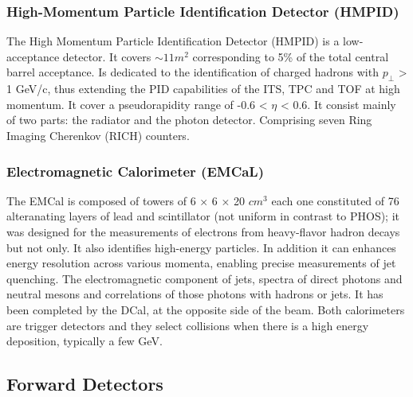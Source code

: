 \documentclass[12pt,a4paper]{book}
\begin{document}
	  \subsubsection{High-Momentum Particle Identification Detector (HMPID)}
 	The High Momentum Particle Identification Detector (HMPID) is a low-acceptance
 	detector. It covers $\sim 11 m^2$ corresponding to 5\% of the total central barrel acceptance.  Is dedicated to the identification of charged hadrons with $p_\perp$ > 1 GeV/c, thus extending the PID capabilities of the ITS, TPC and TOF at high momentum. It cover a pseudorapidity range of -0.6 < $\eta$ < 0.6. It consist mainly of two parts: the radiator and the photon detector. Comprising seven Ring Imaging Cherenkov (RICH) counters. \cite{Padhan:2924203} \cite{amsdottorato9036}
 	\subsubsection{Electromagnetic Calorimeter (EMCaL)}
	The EMCal is composed of towers of 6 × 6 × 20 $cm^3$ each one constituted of 76 alteranating layers of lead and scintillator (not uniform in contrast to PHOS); it was designed for the measurements of electrons from heavy-flavor hadron decays but not only. It also identifies high-energy particles. In addition it can enhances energy resolution across various	momenta, enabling precise measurements of jet quenching. The electromagnetic component of jets, spectra of direct photons and neutral mesons and correlations of those photons	with hadrons or jets. It has been completed by the DCal, at the opposite side of the beam. Both calorimeters are trigger detectors and they select collisions when there is a high energy deposition, typically a few GeV. \cite{Padhan:2924203} \cite{Arata:2922803}
	
	\subsection{Forward Detectors}
\end{document}
